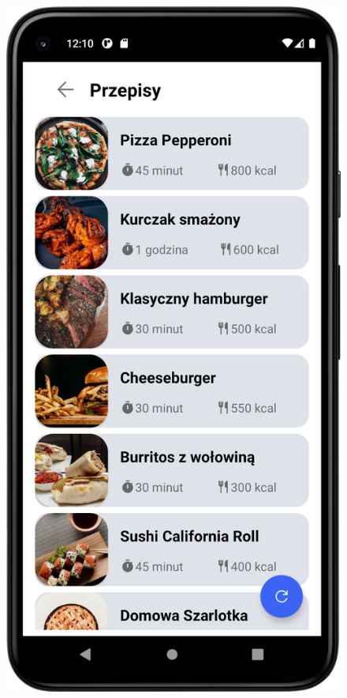 \documentclass{article}
\begin{document}
\begin{enumerate}
\begin{enumerate}
\begin{figure}[ht]
    \centering
    \begin{minipage}[b]{0.4\textwidth}
        \centering
        \includegraphics[width=\textwidth]{../res/phone_list}

\end{minipage}
\end{figure}
\end{enumerate}
\end{enumerate}
\end{document}
